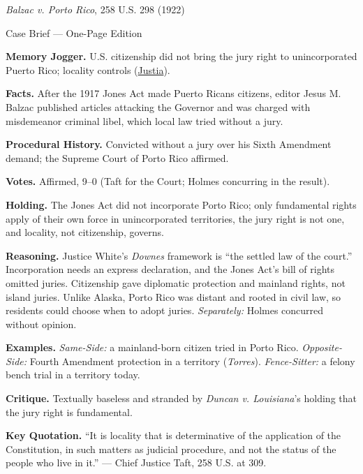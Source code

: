 \documentclass[12pt]{article}
\begin{document}
\begin{center}
{\Large \textit{Balzac v. Porto Rico}, 258 U.S. 298 (1922)\par}
\vspace{0.3em}
{\normalsize Case Brief --- One-Page Edition\par}
\end{center}

\textbf{Memory Jogger.} U.S. citizenship did not bring the jury right to unincorporated Puerto Rico; locality controls (\href{https://supreme.justia.com/cases/federal/us/258/298/}{Justia}).

\textbf{Facts.} After the 1917 Jones Act made Puerto Ricans citizens, editor Jesus M. Balzac published articles attacking the Governor and was charged with misdemeanor criminal libel, which local law tried without a jury.

\textbf{Procedural History.} Convicted without a jury over his Sixth Amendment demand; the Supreme Court of Porto Rico affirmed.

\textbf{Votes.} Affirmed, 9--0 (Taft for the Court; Holmes concurring in the result).

\textbf{Holding.} The Jones Act did not incorporate Porto Rico; only fundamental rights apply of their own force in unincorporated territories, the jury right is not one, and locality, not citizenship, governs.

\textbf{Reasoning.} Justice White's \textit{Downes} framework is ``the settled law of the court.'' Incorporation needs an express declaration, and the Jones Act's bill of rights omitted juries. Citizenship gave diplomatic protection and mainland rights, not island juries. Unlike Alaska, Porto Rico was distant and rooted in civil law, so residents could choose when to adopt juries. \emph{Separately:} Holmes concurred without opinion.

\textbf{Examples.} \emph{Same-Side:} a mainland-born citizen tried in Porto Rico. \emph{Opposite-Side:} Fourth Amendment protection in a territory (\textit{Torres}). \emph{Fence-Sitter:} a felony bench trial in a territory today.

\textbf{Critique.} Textually baseless and stranded by \textit{Duncan v. Louisiana}'s holding that the jury right is fundamental.

\textbf{Key Quotation.} ``It is locality that is determinative of the application of the Constitution, in such matters as judicial procedure, and not the status of the people who live in it.'' --- Chief Justice Taft, 258 U.S. at 309.
\end{document}
